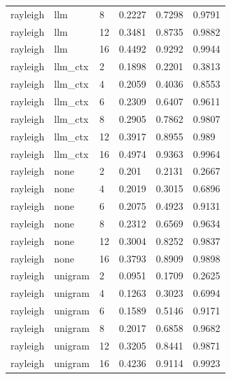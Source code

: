 \begin{tabular}{llllll}
rayleigh & llm & 8 & 0.2227 & 0.7298 & 0.9791 \\
rayleigh & llm & 12 & 0.3481 & 0.8735 & 0.9882 \\
rayleigh & llm & 16 & 0.4492 & 0.9292 & 0.9944 \\
rayleigh & llm\_ctx & 2 & 0.1898 & 0.2201 & 0.3813 \\
rayleigh & llm\_ctx & 4 & 0.2059 & 0.4036 & 0.8553 \\
rayleigh & llm\_ctx & 6 & 0.2309 & 0.6407 & 0.9611 \\
rayleigh & llm\_ctx & 8 & 0.2905 & 0.7862 & 0.9807 \\
rayleigh & llm\_ctx & 12 & 0.3917 & 0.8955 & 0.989 \\
rayleigh & llm\_ctx & 16 & 0.4974 & 0.9363 & 0.9964 \\
rayleigh & none & 2 & 0.201 & 0.2131 & 0.2667 \\
rayleigh & none & 4 & 0.2019 & 0.3015 & 0.6896 \\
rayleigh & none & 6 & 0.2075 & 0.4923 & 0.9131 \\
rayleigh & none & 8 & 0.2312 & 0.6569 & 0.9634 \\
rayleigh & none & 12 & 0.3004 & 0.8252 & 0.9837 \\
rayleigh & none & 16 & 0.3793 & 0.8909 & 0.9898 \\
rayleigh & unigram & 2 & 0.0951 & 0.1709 & 0.2625 \\
rayleigh & unigram & 4 & 0.1263 & 0.3023 & 0.6994 \\
rayleigh & unigram & 6 & 0.1589 & 0.5146 & 0.9171 \\
rayleigh & unigram & 8 & 0.2017 & 0.6858 & 0.9682 \\
rayleigh & unigram & 12 & 0.3205 & 0.8441 & 0.9871 \\
rayleigh & unigram & 16 & 0.4236 & 0.9114 & 0.9923 \\
\hline
\end{tabular}
